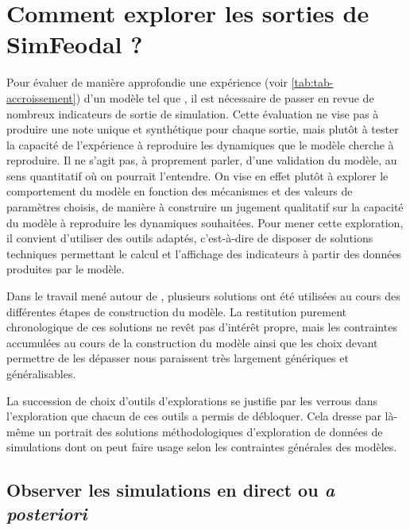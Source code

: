 \section[Comment explorer les sorties de SimFeodal ?]{Comment explorer les sorties de SimFeodal ?%
	}\label{sec:explorer-sorties-simfeodal}

Pour évaluer de manière approfondie une expérience (voir \cref{tab:tab-accroissement}) d'un modèle tel que \simfeodal{}, il est nécessaire de passer en revue de nombreux indicateurs de sortie de simulation.
Cette évaluation ne vise pas à produire une \og note\fg{} unique et synthétique pour chaque sortie, mais plutôt à tester la capacité de l'expérience à reproduire les dynamiques que le modèle cherche à reproduire.
Il ne s'agit pas, à proprement parler, d'une validation du modèle, au sens quantitatif où on pourrait l'entendre.
On vise en effet plutôt à explorer le comportement du modèle en fonction des mécanismes et des valeurs de paramètres choisis, de manière à construire un jugement qualitatif sur la capacité du modèle à reproduire les dynamiques souhaitées.
Pour mener cette exploration, il convient d'utiliser des outils adaptés, c'est-à-dire de disposer de solutions techniques permettant le calcul et l'affichage des indicateurs à partir des données produites par le modèle.

Dans le travail mené autour de \simfeodal{}, plusieurs solutions ont été utilisées au cours des différentes étapes de construction du modèle.
La restitution purement chronologique de ces solutions ne revêt pas d'intérêt propre, mais les contraintes accumulées au cours de la construction du modèle ainsi que les choix devant permettre de les dépasser nous paraissent très largement génériques et généralisables.

La succession de choix d'outils d'explorations se justifie par les verrous dans l'exploration que chacun de ces outils a permis de débloquer.
Cela dresse par là-même un portrait des solutions méthodologiques d'exploration de données de simulations dont on peut faire usage selon les contraintes générales des modèles.

\subsection{Observer les simulations en direct ou \textit{a posteriori}}\label{subsec:observation-a-posteriori}

